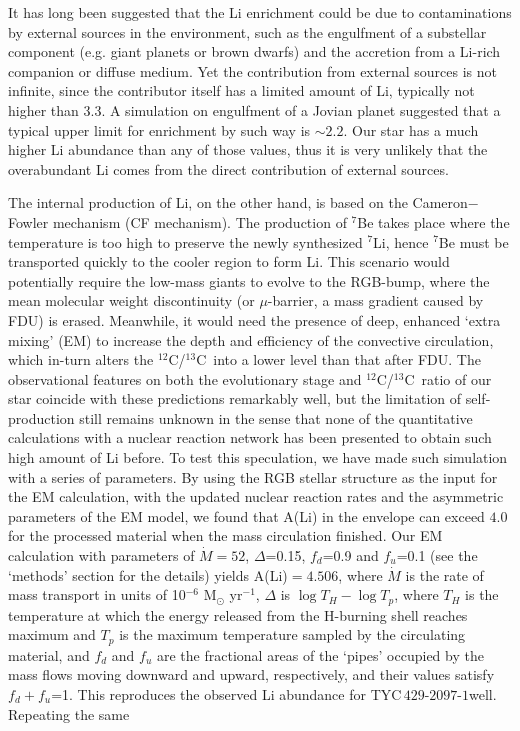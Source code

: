 \documentclass[twoside,onecolumnm,12pt]{article}
\newcommand{\upcite}[1]{\textsuperscript{\textsuperscript{\cite{#1}}}}
\newcommand{\starname}{TYC\,$429$-$2097$-$1$}
\newcommand{\ciso}{$^{12}$C/$^{13}$C}
\begin{document}
It has long been suggested that the Li enrichment could be due to
contaminations by external sources in the
environment, such as the engulfment of a substellar
component\upcite{Alexander1967} (e.g. giant planets or brown dwarfs)
and the accretion from a Li-rich companion or
diffuse medium. Yet the contribution from external sources
is not infinite, since the contributor itself has a
limited amount of Li, typically not higher than 3.3. A simulation on
engulfment of a Jovian planet suggested
that a typical upper limit for enrichment by such
way is $\sim 2.2$\upcite{Aguilera2016}. Our star has
a much higher Li abundance than any of those
values, thus it is very unlikely that the
overabundant Li comes from the direct contribution of external
sources.

The internal production of Li, on the other hand, is based on the
Cameron$-$Fowler mechanism\upcite{Cameron1971} (CF mechanism). The
production of $^{7}$Be takes place where the temperature is too high
to preserve the newly synthesized $^{7}$Li, hence $^{7}$Be must be
transported quickly to the cooler region to form
Li. This scenario would potentially require the
low-mass giants to evolve to the RGB-bump, where
the mean molecular weight discontinuity (or $\mu$-barrier, a mass
gradient caused by FDU) is erased. Meanwhile, it would need the
presence of deep, enhanced `extra mixing' (EM) to increase the depth
and efficiency of the convective circulation, which in-turn alters
the \ciso\ into a lower level than that after FDU. The observational
features on both the evolutionary stage and \ciso\ ratio of our star
coincide with these predictions remarkably well,
but the limitation of self-production still remains unknown in the
sense that none of the quantitative calculations
with a nuclear reaction network has been presented to obtain such
high amount of Li before. To test this speculation, we have made
such simulation with a series of parameters. By using the RGB
stellar structure as the input for the EM calculation, with the
updated nuclear reaction rates and the asymmetric parameters of the
EM model, we found that A(Li) in the envelope can
exceed $4.0$ for the processed material when the mass circulation
finished. Our EM calculation with parameters of $\dot{M} = 52$,
$\Delta$=0.15, $f_d$=0.9 and $f_u$=0.1 (see the `methods' section
for the details) yields A(Li)$=4.506$, where $\dot{M}$ is the rate of mass transport in units of 10$^{-6}$ M$_{\odot}$ yr$^{-1}$, $\Delta$ is $\log T_H-\log T_p$, where $T_H$ is the temperature at which the energy released from the H-burning shell reaches maximum and $T_p$ is the maximum temperature sampled by the circulating material, and $f_d$ and $f_u$ are the fractional areas of the `pipes' occupied by the mass flows moving downward and upward, respectively, and their values satisfy $f_d+f_u$=1. This reproduces the observed Li abundance for \starname well. Repeating the same
\end{document}
